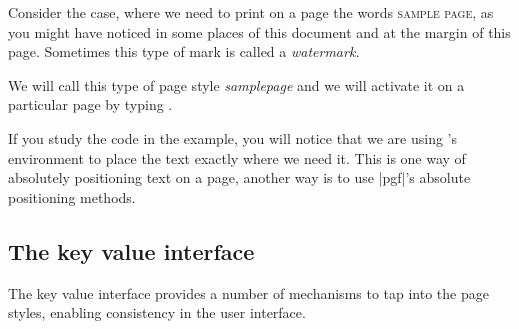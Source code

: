 \thispagestyle{samplepage}
Consider the case, where we need to print on a page the words \textsc{sample page}, as you might have noticed in some places of this document and at the margin of this page. Sometimes this type of mark is called a \textit{watermark.}

We will call this type of page style \textit{samplepage} and we will activate it on a particular page by typing .




%
%
%
%
%

If you study the code in the example, you will notice that we are using \LaTeXe's  environment to
place the text exactly where we need it. This is one way of absolutely positioning text on a page, another way is to use |pgf|’s absolute positioning methods.




\subsection{The key value interface}

The key value interface provides a number of mechanisms to tap into the page styles, enabling consistency in the user interface.

